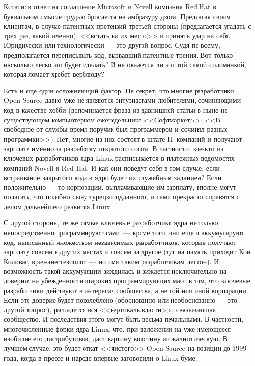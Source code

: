 Кстати: в ответ на соглашение Microsoft и Novell компания Red Hat в буквальном смысле грудью бросается на амбразуру дзота. Предлагая своим клиентам, в случае патентных претензий третьей стороны (предлагается угадать с трех раз, какой именно), <<встать на их место>> и принять удар на себя. Юридически или технологически~--- это другой вопрос. Судя по всему, предполагается переписывать код, вызвавший патентные трения. Вот только насколько легко это будет сделать? И не окажется ли это той самой соломинкой, которая ломает хребет верблюду?

Есть и еще один осложняющий фактор. Не секрет, что многие разработчики Open Source давно уже не являются энтузиастами-любителями, сочиняющими код в качестве хобби (вспоминается фраза из давнишней статьи в ныне не существующем компьютерном еженедельнике <<Софтмаркет>>: <<В свободное от службы время поручик был программером и сочинял разные программки>>). Нет, многие из них состоят в штате IT-компаний и получают зарплату именно за разработку открытого софта. В частности, кое-кто из ключевых разработчиков ядра Linux расписывается в платежных ведомостях компаний Novell и Red Hat. И как они поведут себя в том случае, если встраивание закрытого кода в ядро будет их служебным заданием? Если положительно~--- то корпорации, выплачивающие им зарплату, вполне могут полагать, что подобно сыну турецкоподданного, и сами прекрасно справятся с делом дальнейшего развития Linux.

С другой стороны, те же самые ключевые разработчики ядра не только непосредственно программируют сами~--- кроме того, они еще и аккумулируют код, написанный множеством независимых разработчиков, которые получают зарплату совсем в других местах и совсем за другое (тут на память приходит Кон Коливас, врач-анестезиолог~--- но имя таким разработчикам легион). И возможность такой аккумуляции зиждилась и зиждется исключительно на доверии: на убежденности широких программирующих масс в том, что ключевые разработчики действуют в интересах сообщества, а не той или иной корпорации. Если это доверие будет поколеблено (обоснованно или необоснованно~--- это другой вопрос), распадется вся <<вертикаль власти>>, связывающая сообщество. И последствия этого могут быть весьма печальными. В частности, многочисленные форки ядра Linux, что, при наложении на уже имеющееся изобилие его дистрибутивов, даст картину воистину апокалиптическую. В лучшем случае, это будет откат <<чистого>> Open Source на позиции до 1999 года, когда в прессе и народе впервые заговорили о Linux-буме. 

